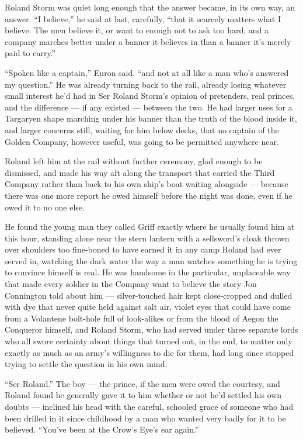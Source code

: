 Roland Storm was quiet long enough that the answer became, in its own way, an answer. “I believe,” he said at last, carefully, “that it scarcely matters what I believe. The men believe it, or want to enough not to ask too hard, and a company marches better under a banner it believes in than a banner it’s merely paid to carry.”

“Spoken like a captain,” Euron said, “and not at all like a man who’s answered my question.” He was already turning back to the rail, already losing whatever small interest he’d had in Ser Roland Storm’s opinion of pretenders, real princes, and the difference — if any existed — between the two. He had larger uses for a Targaryen shape marching under his banner than the truth of the blood inside it, and larger concerns still, waiting for him below decks, that no captain of the Golden Company, however useful, was going to be permitted anywhere near.

Roland left him at the rail without further ceremony, glad enough to be dismissed, and made his way aft along the transport that carried the Third Company rather than back to his own ship’s boat waiting alongside — because there was one more report he owed himself before the night was done, even if he owed it to no one else.

He found the young man they called Griff exactly where he usually found him at this hour, standing alone near the stern lantern with a sellsword’s cloak thrown over shoulders too fine-boned to have earned it in any camp Roland had ever served in, watching the dark water the way a man watches something he is trying to convince himself is real. He was handsome in the particular, unplaceable way that made every soldier in the Company want to believe the story Jon Connington told about him — silver-touched hair kept close-cropped and dulled with dye that never quite held against salt air, violet eyes that could have come from a Volantene bolt-hole full of look-alikes or from the blood of Aegon the Conqueror himself, and Roland Storm, who had served under three separate lords who all swore certainty about things that turned out, in the end, to matter only exactly as much as an army’s willingness to die for them, had long since stopped trying to settle the question in his own mind.

“Ser Roland.” The boy — the prince, if the men were owed the courtesy, and Roland found he generally gave it to him whether or not he’d settled his own doubts — inclined his head with the careful, schooled grace of someone who had been drilled in it since childhood by a man who wanted very badly for it to be believed. “You’ve been at the Crow’s Eye’s ear again.”

